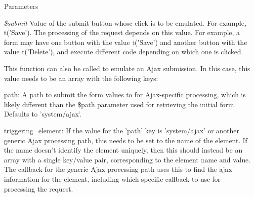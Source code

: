 \begin{DoxyParams}{Parameters}
\item[{\em \$submit}]Value of the submit button whose click is to be emulated. For example, t('Save'). The processing of the request depends on this value. For example, a form may have one button with the value t('Save') and another button with the value t('Delete'), and execute different code depending on which one is clicked.\end{DoxyParams}
This function can also be called to emulate an Ajax submission. In this case, this value needs to be an array with the following keys:
\begin{DoxyItemize}
\item path: A path to submit the form values to for Ajax-\/specific processing, which is likely different than the \$path parameter used for retrieving the initial form. Defaults to 'system/ajax'.
\item triggering\_\-element: If the value for the 'path' key is 'system/ajax' or another generic Ajax processing path, this needs to be set to the name of the element. If the name doesn't identify the element uniquely, then this should instead be an array with a single key/value pair, corresponding to the element name and value. The callback for the generic Ajax processing path uses this to find the ajax information for the element, including which specific callback to use for processing the request.
\end{DoxyItemize}

